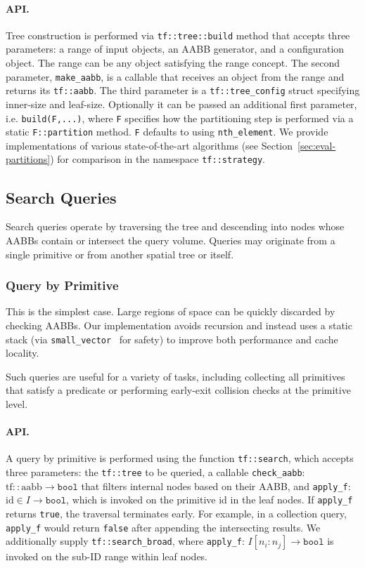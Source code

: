 \paragraph*{API.} Tree construction is performed via 
\texttt{tf::tree::build} method that accepts three parameters:
a range of input objects, an AABB generator, and
a configuration object. The range can be any object 
satisfying the \cpp range concept. The second parameter,
\texttt{make\_aabb}, is a callable that receives an object
from the range and returns its \texttt{tf::aabb}. The third parameter
is a \texttt{tf::tree\_config} struct specifying inner-size and leaf-size.
Optionally it can be passed an additional first parameter, i.e. \texttt{build(F,...)},
where \texttt{F} specifies how the partitioning step is performed via
a static \texttt{F::partition} method. \texttt{F} defaults to
using \texttt{nth\_element}. We provide implementations of
various state-of-the-art algorithms\cite{mini-select}
(see Section~\ref{sec:eval-partitions})
for comparison in the namespace \texttt{tf::strategy}.

\subsection{Search Queries}

Search queries operate by traversing the tree and descending
into nodes whose AABBs contain or intersect the query volume.
Queries may originate from a single primitive or from another
spatial tree or itself.

\subsubsection{Query by Primitive}
This is the simplest case. Large regions of space can be
quickly discarded by checking AABBs. Our implementation avoids
recursion and instead uses a static stack (via
\texttt{small\_vector}~\cite{llvm-small-vector} for safety) to
improve both performance and cache locality.

Such queries are useful for a variety of tasks, including
collecting all primitives that satisfy a predicate or
performing early-exit collision checks at the primitive level.

\paragraph*{API.}
A query by primitive is performed using the function
\texttt{tf::search}, which accepts three parameters:
the \texttt{tf::tree} to be queried, a callable
\texttt{check\_aabb}: $\mathrm{tf::aabb} \to \texttt{bool}$
that filters internal nodes based on their AABB,
and \texttt{apply\_f}: $\mathrm{id}\in I \to \texttt{bool}$,
which is invoked on the primitive id in the leaf nodes.
If \texttt{apply\_f} returns \texttt{true}, the traversal
terminates early. For example, in a collection query,
\texttt{apply\_f} would return \texttt{false} after
appending the intersecting results. We additionally
supply \texttt{tf::search\_broad}, where
\texttt{apply\_f}: $I[n_i:n_j] \to \texttt{bool}$
is invoked on the sub-ID range within leaf nodes.

